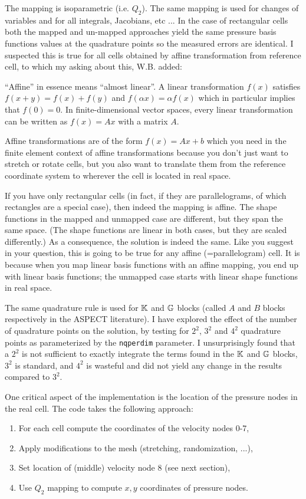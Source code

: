 The mapping is isoparametric (i.e. $Q_2$). The same mapping is used for changes 
of variables and for all integrals, Jacobians, etc ...
In the case of rectangular cells both the mapped and un-mapped approaches 
yield the same pressure basis functions values at the quadrature points
so the measured errors are identical.
I suspected this is true for all cells obtained by affine transformation
from reference cell, to which my asking about this, W.B. added:
\begin{displayquote}
{\color{darkgray}
``Affine'' in essence means ``almost linear''. A linear transformation $f(x)$
satisfies $f(x+y) = f(x)+f(y)$ and  $f(\alpha x) = \alpha f(x)$
which in particular implies that $f(0)=0$. 
In finite-dimensional vector spaces, every linear transformation can be written as
$ f(x) = Ax $ with a matrix $A$. 

Affine transformations are of the form $f(x) = Ax + b$
which you need in the finite element context of affine transformations because
you don't just want to stretch or rotate cells, but you also want to translate
them from the reference coordinate system to wherever the cell is located in
real space.

If you have only rectangular cells (in fact, if they are parallelograms, of
which rectangles are a special case), then indeed the mapping is affine. The
shape functions in the mapped and unmapped case are different, but they span
the same space. (The shape functions are linear in both cases, but they are
scaled differently.) As a consequence, the solution is indeed the same. Like
you suggest in your question, this is going to be true for any affine
(=parallelogram) cell. It is because when you map linear basis functions with
an affine mapping, you end up with linear basis functions; the unmapped case
starts with linear shape functions in real space. 
}
\end{displayquote}

The same quadrature rule is used for ${\mathbb{K}}$ and ${\mathbb{G}}$ blocks (called $A$ and $B$ blocks 
respectively in the ASPECT literature).
I have explored the effect of the number of quadrature points on the solution, 
by testing for $2^2$, $3^2$ and $4^2$ quadrature points
as parameterized by the \lstinline{nqperdim} parameter.
I unsurprisingly found that a $2^2$ is not sufficient to exactly integrate the 
terms found in the ${\mathbb{K}}$ and ${\mathbb{G}}$ blocks, $3^2$ is standard, 
and $4^2$ is wasteful and did not yield any change in the results compared to $3^2$.

One critical aspect of the implementation is the location of the pressure nodes
in the real cell. The code takes the following approach:
\begin{enumerate}
\item For each cell compute the coordinates of the velocity nodes 0-7,
\item Apply modifications to the mesh (stretching, randomization, ...),
\item Set location of (middle) velocity node 8 (see next section),
\item Use $Q_2$ mapping to compute $x,y$ coordinates of pressure nodes.
\end{enumerate}


